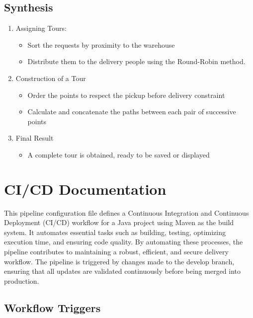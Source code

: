 \documentclass[a4paper]{article}
\begin{document}
\subsection{Synthesis}
\begin{enumerate}
    \item Assigning Tours:
    \begin{itemize}
        \item Sort the requests by proximity to the warehouse
        \item Distribute them to the delivery people using the Round-Robin method.
    \end{itemize}
    \item Construction of a Tour
    \begin{itemize}
        \item Order the points to respect the pickup before delivery constraint
        \item Calculate and concatenate the paths between each pair of successive points
    \end{itemize}
    \item Final Result
    \begin{itemize}
        \item A complete tour is obtained, ready to be saved or displayed
    \end{itemize}
\end{enumerate}


\section{CI/CD Documentation}

This pipeline configuration file defines a Continuous Integration and Continuous Deployment (CI/CD) workflow for a Java project using Maven as the build system. It automates essential tasks such as building, testing, optimizing execution time, and ensuring code quality. By automating these processes, the pipeline contributes to maintaining a robust, efficient, and secure delivery workflow. The pipeline is triggered by changes made to the develop branch, ensuring that all updates are validated continuously before being merged into production.

\subsection{Workflow Triggers}
\end{document}
